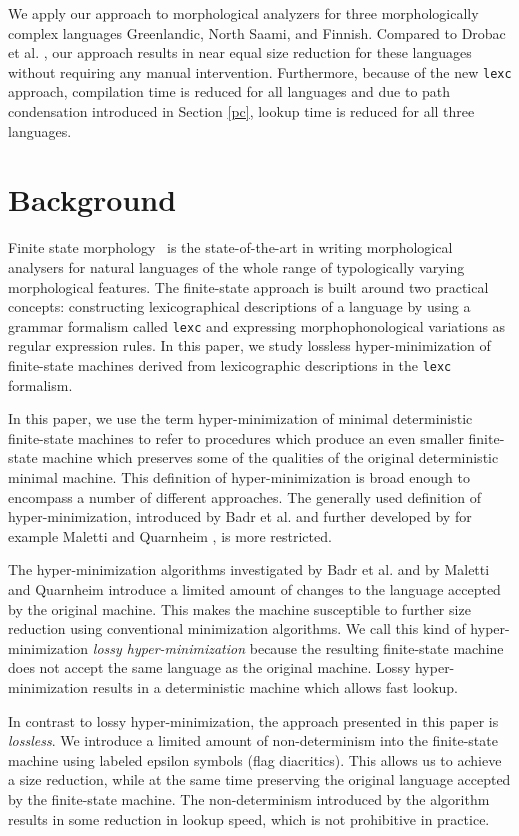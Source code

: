 \documentclass[11pt]{article}
\begin{document}
We apply our approach to morphological analyzers for three
morphologically complex languages Greenlandic, North Saami, and
Finnish. Compared to Drobac et al. , our
approach results in near equal size reduction for these languages
without requiring any manual intervention. Furthermore, because of the
new \texttt{lexc} approach, compilation time is reduced for all
languages and due to path condensation introduced in Section \ref{pc},
lookup time is reduced for all three languages.

\section{Background}
Finite state morphology~\cite{beesley2003finite} is the
state-of-the-art in writing morphological analysers for natural
languages of the whole range of typologically varying morphological
features. The finite-state approach is built around two practical
concepts: constructing lexicographical descriptions of a language
by using a grammar formalism called \texttt{lexc} and expressing morphophonological
variations as regular expression rules. In this paper, we study lossless
hyper-minimization of finite-state machines derived from lexicographic
descriptions in the \texttt{lexc} formalism.

In this paper, we use the term hyper-minimization of minimal
deterministic finite-state machines to refer to procedures which
produce an even smaller finite-state machine which preserves some of
the qualities of the original deterministic minimal machine. This
definition of hyper-minimization is broad enough to encompass a number
of different approaches. The generally used definition of
hyper-minimization, introduced by Badr et al.  and
further developed by for example Maletti and Quarnheim , is
more restricted.

The hyper-minimization algorithms investigated by Badr et
al.  and by Maletti and Quarnheim
 introduce a limited amount of changes to the
language accepted by the original machine. This makes the machine
susceptible to further size reduction using conventional minimization
algorithms. We call this kind of hyper-minimization {\it lossy
  hyper-minimization} because the resulting finite-state machine does
not accept the same language as the original machine. Lossy
hyper-minimization results in a deterministic machine which allows
fast lookup.

In contrast to lossy hyper-minimization, the approach presented in
this paper is {\it lossless}. We introduce a limited amount of
non-determinism into the finite-state machine using labeled epsilon
symbols (flag diacritics). This allows us to achieve a size reduction,
while at the same time preserving the original language accepted by
the finite-state machine. The non-determinism introduced by the
algorithm results in some reduction in lookup speed, which is not
prohibitive in practice.
\end{document}
